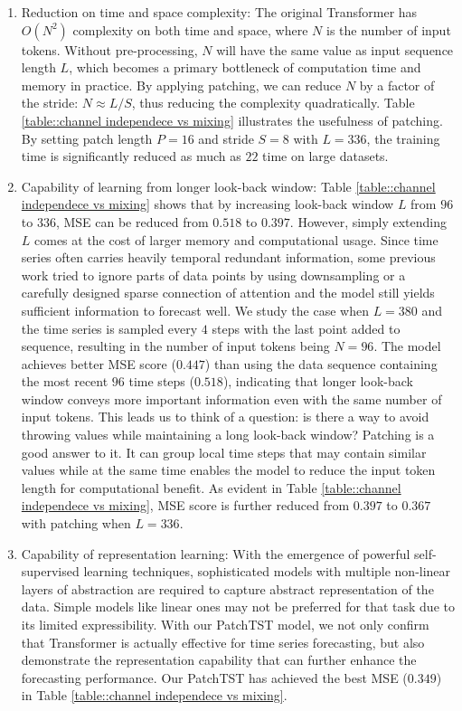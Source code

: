 \documentclass{article} \usepackage{iclr2023_conference,times}
\begin{document}
\begin{enumerate}[leftmargin= 25 pt,itemsep= 5 pt,topsep = 0 pt]
    \item Reduction on time and space complexity: The original Transformer has $O(N^2)$ complexity on both time and space, where $N$ is the number of input tokens. Without pre-processing, $N$ will have the same value as input sequence length $L$, which becomes a primary bottleneck of computation time and memory in practice. By applying patching, we can reduce $N$ by a factor of the stride: $N\approx L/S$, thus reducing the complexity quadratically. Table \ref{table::channel independece vs mixing} illustrates the usefulness of patching. By setting patch length $P=16$ and
    stride $S=8$ with $L=336$, the training time is significantly reduced as much as $22$ time on large datasets.

    \item Capability of learning from longer look-back window: Table \ref{table::channel independece vs mixing} shows that by increasing look-back window $L$ from $96$ to $336$, MSE can be reduced from $0.518$ to $0.397$. However, simply extending $L$ comes at the cost of larger memory and computational usage. 
    Since time series often carries heavily temporal redundant information, some previous work tried to ignore parts of data points by using downsampling or a carefully designed sparse connection of attention \citep{logtrans} and the model still yields sufficient information to forecast well. 
    We study the case when $L=380$ and the time series is sampled every $4$ steps with the last point added to sequence, resulting in the number of input tokens being $N=96$. The model achieves better MSE score ($0.447$) than using the data sequence containing the most recent $96$ time steps ($0.518$), indicating that longer look-back window conveys more important information even with the same number of input tokens. This leads us to think of a question: is there a way to avoid throwing values while maintaining a long look-back window? Patching is a good answer to it. It can group local time steps that may contain similar values while at the same time enables the model to reduce the input token length for computational benefit. As evident in Table \ref{table::channel independece vs mixing}, MSE score is further reduced from $0.397$ to $0.367$ with patching when $L=336$.

    
    \item Capability of representation learning: With the emergence of powerful self-supervised learning techniques, sophisticated models with multiple non-linear layers of abstraction are required to capture abstract representation of the data. Simple models like linear ones \citep{dlinear} may not be preferred for that task due to its limited expressibility. With our PatchTST model, we not only confirm that Transformer is actually effective for time series forecasting, but also demonstrate the representation capability that can further enhance the forecasting performance. Our PatchTST has achieved the best MSE ($0.349$) in Table \ref{table::channel independece vs mixing}.
\end{enumerate}
\end{document}
